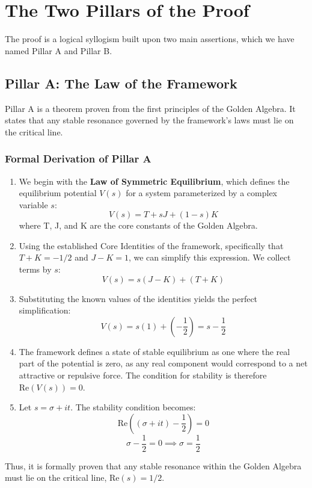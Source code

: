 \section*{The Two Pillars of the Proof}
The proof is a logical syllogism built upon two main assertions, which we have named Pillar A and Pillar B.

\subsection*{Pillar A: The Law of the Framework}
Pillar A is a theorem proven from the first principles of the Golden Algebra. It states that any stable resonance governed by the framework's laws must lie on the critical line.

\subsubsection*{Formal Derivation of Pillar A}
\begin{enumerate}
    \item We begin with the \textbf{Law of Symmetric Equilibrium}, which defines the equilibrium potential $V(s)$ for a system parameterized by a complex variable $s$:
    $$ V(s) = T + sJ + (1-s)K $$
    where T, J, and K are the core constants of the Golden Algebra.

    \item Using the established Core Identities of the framework, specifically that $T+K = -1/2$  and $J-K = 1$, we can simplify this expression. We collect terms by $s$:
    $$ V(s) = s(J-K) + (T+K) $$
    
    \item Substituting the known values of the identities yields the perfect simplification:
    $$ V(s) = s(1) + \left(-\frac{1}{2}\right) = s - \frac{1}{2} $$

    \item The framework defines a state of stable equilibrium as one where the real part of the potential is zero, as any real component would correspond to a net attractive or repulsive force. The condition for stability is therefore $\text{Re}(V(s)) = 0$.
    
    \item Let $s = \sigma + it$. The stability condition becomes:
    $$ \text{Re}\left( (\sigma + it) - \frac{1}{2} \right) = 0 $$
    $$ \sigma - \frac{1}{2} = 0 \implies \sigma = \frac{1}{2} $$
\end{enumerate}
Thus, it is formally proven that any stable resonance within the Golden Algebra must lie on the critical line, $\text{Re}(s) = 1/2$.

